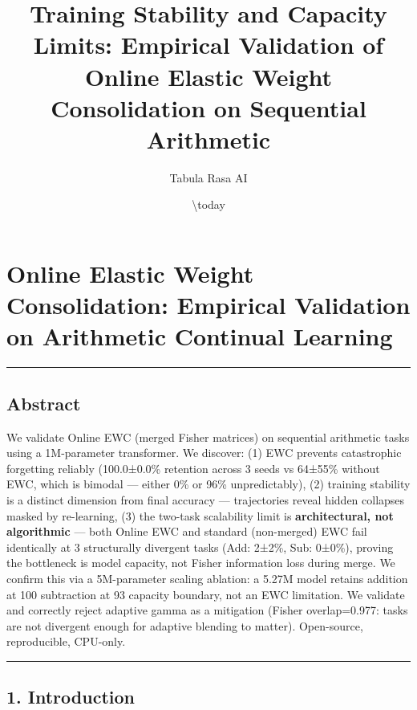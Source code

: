 \documentclass[
]{article}
\title{Training Stability and Capacity Limits: Empirical Validation of
Online Elastic Weight Consolidation on Sequential Arithmetic}
\author{Tabula Rasa AI}
\date{\textbackslash today}
\begin{document}
\maketitle

\section{Online Elastic Weight Consolidation: Empirical Validation on
Arithmetic Continual
Learning}\label{online-elastic-weight-consolidation-empirical-validation-on-arithmetic-continual-learning}

\begin{center}\rule{0.5\linewidth}{0.5pt}\end{center}

\subsection{Abstract}\label{abstract}

We validate Online EWC (merged Fisher matrices) on sequential arithmetic
tasks using a 1M-parameter transformer. We discover: (1) EWC prevents
catastrophic forgetting reliably (100.0±0.0\% retention across 3 seeds
vs 64±55\% without EWC, which is bimodal --- either 0\% or 96\%
unpredictably), (2) training stability is a distinct dimension from
final accuracy --- trajectories reveal hidden collapses masked by
re-learning, (3) the two-task scalability limit is
\textbf{architectural, not algorithmic} --- both Online EWC and standard
(non-merged) EWC fail identically at 3 structurally divergent tasks
(Add: 2±2\%, Sub: 0±0\%), proving the bottleneck is model capacity, not
Fisher information loss during merge. We confirm this via a 5M-parameter
scaling ablation: a 5.27M model retains addition at 100%
subtraction at 93%
capacity boundary, not an EWC limitation. We validate and correctly reject
adaptive gamma as a mitigation (Fisher overlap=0.977: tasks are not
divergent enough for adaptive blending to matter). Open-source,
reproducible, CPU-only.

\begin{center}\rule{0.5\linewidth}{0.5pt}\end{center}

\subsection{1. Introduction}\label{introduction}
\end{document}
